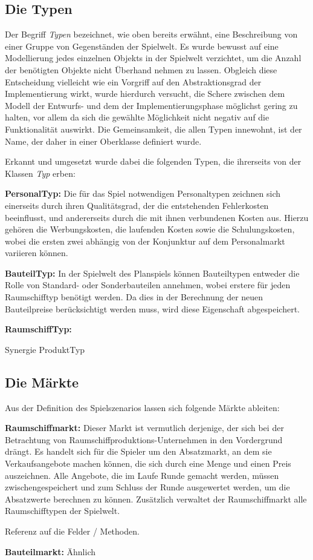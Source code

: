 \subsection{Die Typen}
Der Begriff \textit{Typen} bezeichnet, wie oben bereits erwähnt, eine Beschreibung von einer Gruppe von Gegenständen der Spielwelt. Es wurde bewusst auf eine Modellierung jedes einzelnen Objekts in der Spielwelt verzichtet, um die Anzahl der benötigten Objekte nicht Überhand nehmen zu lassen. Obgleich diese Entscheidung vielleicht wie ein Vorgriff auf den Abstraktionsgrad der Implementierung wirkt, wurde hierdurch versucht, die Schere zwischen dem Modell der Entwurfs- und dem der Implementierungsphase möglichst gering zu halten, vor allem da sich die gewählte Möglichkeit nicht negativ auf die Funktionalität auswirkt. Die Gemeinsamkeit, die allen Typen innewohnt, ist der Name, der daher in einer Oberklasse definiert wurde.

Erkannt und umgesetzt wurde dabei die folgenden Typen, die ihrerseits von der Klassen \textit{Typ} erben:
\begin{seList}
\item \textbf{PersonalTyp:} Die für das Spiel notwendigen Personaltypen zeichnen sich einerseits durch ihren Qualitätsgrad, der die entstehenden Fehlerkosten beeinflusst, und andererseits durch die mit ihnen verbundenen Kosten aus. Hierzu gehören die Werbungskosten, die laufenden Kosten sowie die Schulungskosten, wobei die ersten zwei abhängig von der Konjunktur auf dem Personalmarkt variieren können.
\item \textbf{BauteilTyp:} In der Spielwelt des Planspiels können Bauteiltypen entweder die Rolle von Standard- oder Sonderbauteilen annehmen, wobei erstere für jeden Raumschifftyp benötigt werden. Da dies in der Berechnung der neuen Bauteilpreise berücksichtigt werden muss, wird diese Eigenschaft abgespeichert.
\item \textbf{RaumschiffTyp:}
\end{seList}

Synergie ProduktTyp

\subsection{Die Märkte}
Aus der Definition des Spielszenarios lassen sich folgende Märkte ableiten:
\begin{seList}
\item \textbf{Raumschiffmarkt:} Dieser Markt ist vermutlich derjenige, der sich bei der Betrachtung von Raumschiffproduktions-Unternehmen in den Vordergrund drängt. Es handelt sich für die Spieler um den Absatzmarkt, an dem sie Verkaufsangebote machen können, die sich durch eine Menge und einen Preis auszeichnen. Alle Angebote, die im Laufe Runde gemacht werden, müssen zwischengespeichert und zum Schluss der Runde ausgewertet werden, um die Absatzwerte berechnen zu können. Zusätzlich verwaltet der Raumschiffmarkt alle Raumschifftypen der Spielwelt.

Referenz auf die Felder / Methoden.
\item \textbf{Bauteilmarkt:} Ähnlich
\end{seList}


